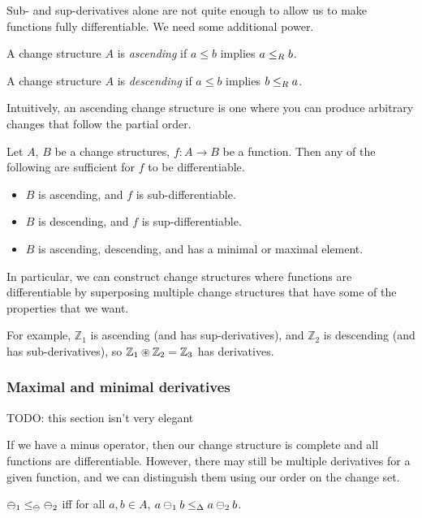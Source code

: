 Sub- and sup-derivatives alone are not quite enough to allow us to make
functions fully differentiable. We need some additional power.

\begin{defn}
  A change structure $A$ is \textit{ascending} if $a \leq b$ implies $a
  \leq_R b$.

  A change structure $A$ is \textit{descending} if $a \leq b$ implies $b
  \leq_R a$.
\end{defn}

Intuitively, an ascending change structure is one where you can produce
arbitrary changes that follow the partial order.

\begin{thm}
  Let $A$, $B$ be a change structures, $f: A \rightarrow B$ be a function. Then
  any of the following are sufficient for $f$ to be differentiable.
  \begin{itemize}
    \item $B$ is ascending, and $f$ is sub-differentiable.
    \item $B$ is descending, and $f$ is sup-differentiable.
    \item $B$ is ascending, descending, and has a minimal or maximal element.
  \end{itemize}
\end{thm}

In particular, we can construct change structures where functions are
differentiable by superposing multiple change structures that have some of the
properties that we want.

For example, $\mathbb{Z}_1$ is ascending (and has sup-derivatives), and
$\mathbb{Z}_2$ is descending (and has sub-derivatives), so $\mathbb{Z}_1
\circledast \mathbb{Z}_2 = \mathbb{Z}_3$ has derivatives.

\subsubsection{Maximal and minimal derivatives}

TODO: this section isn't very elegant

If we have a minus operator, then our change structure is complete and all
functions are differentiable. However, there may still be multiple derivatives
for a given function, and we can distinguish them using our order on the change
set.

\begin{defn}
  $\ominus_1 \leq_\ominus \ominus_2$ iff for all $a,b \in A$, $a \ominus_1 b
  \leq_\Delta a \ominus_2 b$.
\end{defn}


